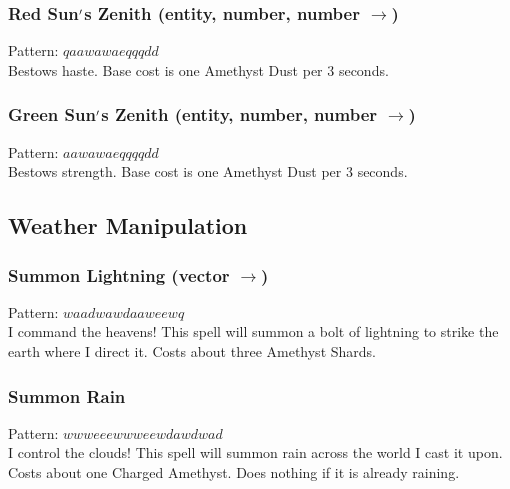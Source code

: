 \documentclass[12pt]{article}
\begin{document}
  \label{sec: patterns/great_spells/zeniths@hexcasting:potion/haste}
\subsubsection*{Red Sun$\rq$s Zenith (entity, number, number $\rightarrow$)}

    Pattern: $qaawawaeqqqdd$\\
      Bestows haste. Base cost is one Amethyst Dust per 3 seconds.\\


  \label{sec: patterns/great_spells/zeniths@hexcasting:potion/strength}
\subsubsection*{Green Sun$\rq$s Zenith (entity, number, number $\rightarrow$)}

    Pattern: $aawawaeqqqqdd$\\
      Bestows strength. Base cost is one Amethyst Dust per 3 seconds.\\

\newpage

\label{sec:patterns/great_spells/weather_manip}
\subsection*{Weather Manipulation}


  \label{sec: patterns/great_spells/weather_manip@hexcasting:lightning}
\subsubsection*{Summon Lightning (vector $\rightarrow$)}

    Pattern: $waadwawdaaweewq$\\
      I command the heavens! This spell will summon a bolt of lightning to strike the earth where I direct it. Costs about three Amethyst Shards.\\


  \label{sec: patterns/great_spells/weather_manip@hexcasting:summon_rain}
\subsubsection*{Summon Rain}

    Pattern: $wwweeewwweewdawdwad$\\
      I control the clouds! This spell will summon rain across the world I cast it upon. Costs about one Charged Amethyst. Does nothing if it is already raining.\\
\end{document}
